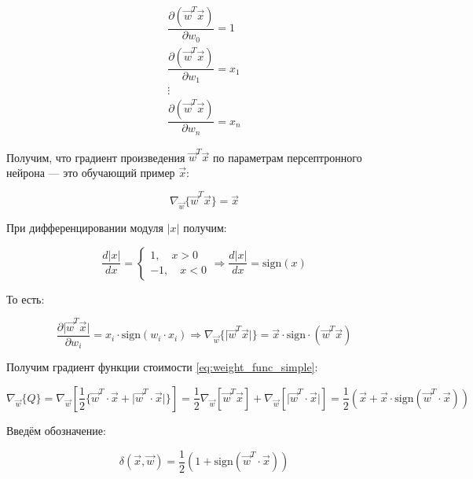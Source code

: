 \documentclass{article}
\numberwithin{equation}{subsection}
\begin{document}
\begin{align*}
    \dfrac{\partial \left( \vec{w}^T \vec{x} \right)}{\partial w_0} = 1 \\
    \dfrac{\partial \left( \vec{w}^T \vec{x} \right)}{\partial w_1} = x_1 \\
    \vdots \\
    \dfrac{\partial \left( \vec{w}^T \vec{x} \right)}{\partial w_n} = x_n
\end{align*}

Получим, что градиент произведения $\vec{w}^T \vec{x}$ по параметрам персептронного
нейрона --- это обучающий пример $\vec{x}$:

\begin{equation}
    \nabla_{\vec{w}} \{\vec{w}^T \vec{x} \} = \vec{x}
\end{equation}

При дифференцировании модуля $\lvert x \rvert$ получим:

\begin{equation}
    \dfrac{d\lvert x \rvert}{dx} =
    \begin{cases}
        1, \quad x>0 \\
        -1, \quad x<0
    \end{cases}
    \Rightarrow \dfrac{d\lvert x \rvert}{dx} = \mathrm{sign} (x)
\end{equation}

То есть:

\begin{equation}
    \dfrac{\partial \lvert \vec{w}^T \vec{x} \rvert}{\partial w_i} = x_i \cdot \mathrm{sign} (w_i \cdot x_i)
    \Rightarrow \nabla_{\vec{w}} \{\lvert \vec{w}^T \vec{x} \rvert\} = \vec{x} \cdot \mathrm{sign} \cdot (\vec{w}^T \vec{x})
\end{equation}

Получим градиент функции стоимости \ref{eq:weight_func_simple}:

\begin{equation}
    \nabla_{\vec{w}} \{Q\} = \nabla_{\vec{w}} \left[\dfrac{1}{2} \{ \vec{w}^T \cdot \vec{x} + 
    \lvert \vec{w}^T \cdot \vec{x}  \rvert \} \right] 
    = \dfrac{1}{2}  \nabla_{\vec{w}} \left[ \vec{w}^T \vec{x} \right] + 
    \nabla_{\vec{w}} \left[ \lvert \vec{w}^T \cdot \vec{x}  \rvert \right]
    = \dfrac{1}{2} \left(\vec{x} + \vec{x} \cdot \mathrm{sign} (\vec{w}^T \cdot \vec{x})\right)
\end{equation}

Введём обозначение:

\begin{equation}
    \delta (\vec{x}, \vec{w}) = \dfrac{1}{2} \left( 1 + \mathrm{sign} (\vec{w}^T \cdot \vec{x}) \right)
\end{equation}
\end{document}
